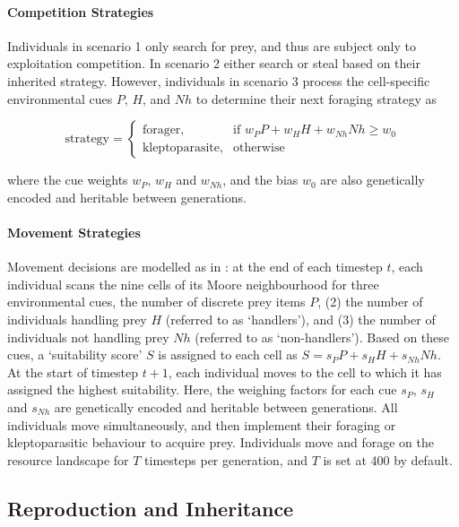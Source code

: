 \documentclass[11pt]{article}
\begin{document}
\paragraph{Competition Strategies}

Individuals in scenario 1 only search for prey, and thus are subject only to exploitation competition. 
In scenario 2 either search or steal based on their inherited strategy.
However, individuals in scenario 3 process the cell-specific environmental cues $P$, $H$, and $Nh$ to determine their next foraging strategy as
\begin{linenomath*}
    \begin{equation}
        \text{strategy} = 
    \begin{cases}
        \text{forager},& \text{if } w_PP + w_HH + w_{Nh}Nh \geq w_0\\
        \text{kleptoparasite},              & \text{otherwise}
    \end{cases}
    \end{equation}  
\end{linenomath*}
where the cue weights $w_P$, $w_H$ and $w_{Nh}$, and the bias $w_0$ are also genetically encoded and heritable between generations.

\paragraph{Movement Strategies}

Movement decisions are modelled as in \citep{netz2020}: at the end of each timestep $t$, each individual scans the nine cells of its Moore neighbourhood for three environmental cues, the number of discrete prey items $P$, (2) the number of individuals handling  prey $H$ (referred to as `handlers'), and (3) the number of individuals not handling prey $Nh$ (referred to as `non-handlers').
Based on these cues, a `suitability score' $S$ is assigned to each cell as $S = s_PP + s_HH + s_{Nh}Nh$.
At the start of timestep $t+1$, each individual moves to the cell to which it has assigned the highest suitability.
Here, the weighing factors for each cue $s_P$, $s_H$ and $s_{Nh}$ are genetically encoded and heritable between generations.
All individuals move simultaneously, and then implement their foraging or kleptoparasitic behaviour to acquire prey.
Individuals move and forage on the resource landscape for $T$ timesteps per generation, and $T$ is set at 400 by default.

\subsection{Reproduction and Inheritance}
\end{document}
